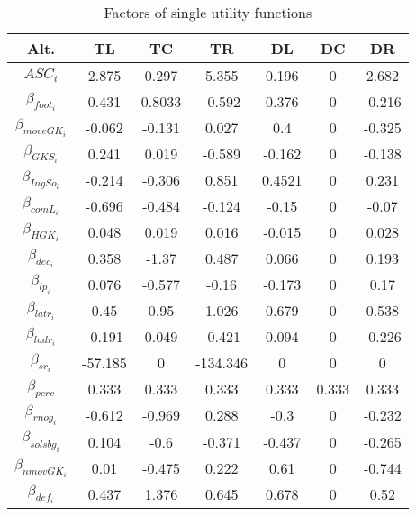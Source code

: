 \documentclass[12pt,dvipsnames]{article}%
\begin{document}
  \begin{table}[ht]
\caption{Factors of single utility functions}
\centering
\begin{tabular}{  c |  c | c  | c |  c |  c | c }
   Alt.  & TL & TC  & TR  & DL & DC & DR \\
   \hline

$ASC_i$     & 2.875    &  0.297 &  5.355   & 0.196    &  0 & 2.682  \\ 

$\beta_{foot_i}$  & 0.431    & 0.8033 &  -0.592   & 0.376   &  0 & -0.216  \\ 

$\beta_{moveGK_i}$  & -0.062   & -0.131 & 0.027 & 0.4  &  0 & -0.325   \\ 

$\beta_{GKS_i}$ & 0.241     & 0.019  & -0.589 & -0.162    &  0 & -0.138   \\ 

$\beta_{IngSo_i}$  & -0.214   &  -0.306 &  0.851  & 0.4521  &  0 & 0.231   \\ 

$\beta_{comL_i}$  & -0.696  & -0.484  &  -0.124  & -0.15  &  0 & -0.07   \\ 

$\beta_{HGK_i}$  & 0.048     & 0.019  &  0.016  & -0.015 &  0 & 0.028   \\ 

$\beta_{dec_i}$ & 0.358    &  -1.37 &  0.487  & 0.066    & 0  & 0.193  \\ 

$\beta_{lp_i}$ & 0.076     & -0.577  &  -0.16      & -0.173    & 0 & 0.17   \\ 

$\beta_{latr_i}$  & 0.45   &  0.95  &  1.026   & 0.679    & 0 & 0.538  \\ 

$\beta_{ladr_i}$  & -0.191    &  0.049 &  -0.421   & 0.094   &  0 & -0.226   \\ 

$\beta_{sr_i}$   & -57.185    & 0  &  -134.346   & 0    &  0 & 0   \\ 

$\beta_{perc}$    & 0.333    & 0.333  &  0.333   & 0.333    &  0.333 & 0.333   \\


$\beta_{rnog_i}$   & -0.612    & -0.969  &  0.288  & -0.3    &  0 & -0.232 \\

$\beta_{solsbg_i}$  & 0.104  & -0.6  &  -0.371   & -0.437    &  0 & -0.265  \\

$\beta_{nmovGK_i}$  & 0.01    & -0.475  &  0.222  & 0.61  & 0 & -0.744 \\

$\beta_{def_i}$  & 0.437    & 1.376  &  0.645  & 0.678  & 0 & 0.52 \\

 \end{tabular}
 \end{table}
 
\end{document}

